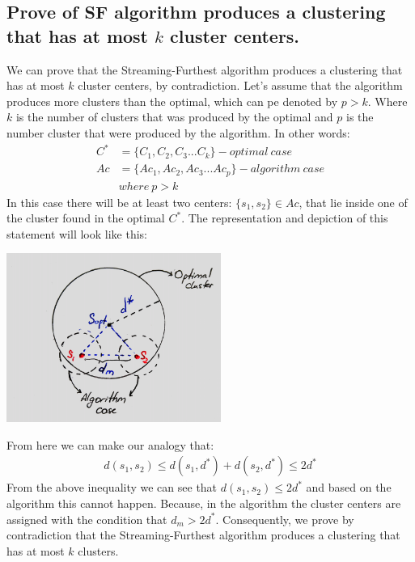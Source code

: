 \documentclass[11pt,a4paper,english]{article}
\begin{document}
      \subsection{Prove of SF algorithm produces a clustering that has at most $k$ cluster centers.}
        We can prove that the Streaming-Furthest algorithm produces a clustering that has at most $k$ cluster centers, by contradiction. Let's assume that the algorithm produces more clusters than the optimal, which can pe denoted by $p > k$. Where $k$ is the number of clusters that was produced by the optimal and $p$ is the number cluster that were produced by the algorithm. In other words:
        \begin{align*}
          C^* & = \{C_1, C_2, C_3 ... C_k\} - optimal\ case \\
          Ac & = \{Ac_1, Ac_2, Ac_3 ... Ac_p\} - algorithm\ case \\
          & where \ p > k
        \end{align*}
        In this case there will be at least two centers: $\{s_1, s_2\} \in Ac $, that lie inside one of the cluster found in the optimal $C^*$.
        The representation and depiction of this statement will look like this:
        \begin{center}
          \includegraphics[width=7cm]{sc_8.png}
        \end{center}
        From here we can make our analogy that:
        \begin{align*}
          d(s_1, s_2) \leq d(s_1, d^*) + d(s_2, d^*) \leq 2d^*
        \end{align*}
        From the above inequality we can see that $d(s_1, s_2) \leq 2d^*$ and based on the algorithm this cannot happen. Because, in the algorithm the cluster centers are assigned with the condition that $d_m > 2d^*$. Consequently, we prove by contradiction that the Streaming-Furthest algorithm produces a clustering that has at most $k$ clusters.
\end{document}
